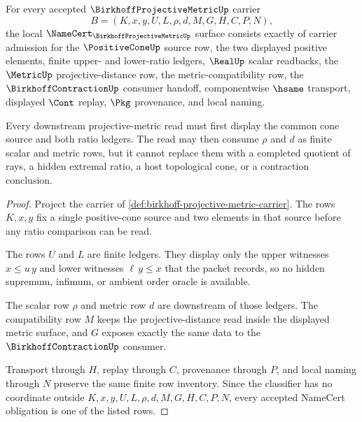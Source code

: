 \begin{theorem}\label{thm:birkhoff-projective-metric-namecert-obligations}
For every accepted $\BirkhoffProjectiveMetricUp$ carrier
$$
B=(K,x,y,U,L,\rho,d,M,G,H,C,P,N),
$$
the local $\NameCert_{\BirkhoffProjectiveMetricUp}$ surface consists exactly of carrier admission for the $\PositiveConeUp$ source row, the two displayed positive elements, finite upper- and lower-ratio ledgers, $\RealUp$ scalar readbacks, the $\MetricUp$ projective-distance row, the metric-compatibility row, the $\BirkhoffContractionUp$ consumer handoff, componentwise $\hsame$ transport, displayed $\Cont$ replay, $\Pkg$ provenance, and local naming.

Every downstream projective-metric read must first display the common cone source and both ratio ledgers. The read may then consume $\rho$ and $d$ as finite scalar and metric rows, but it cannot replace them with a completed quotient of rays, a hidden extremal ratio, a host topological cone, or a contraction conclusion.
\end{theorem}
\begin{proof}
Project the carrier of \autoref{def:birkhoff-projective-metric-carrier}. The rows $K,x,y$ fix a single positive-cone source and two elements in that source before any ratio comparison can be read.

The rows $U$ and $L$ are finite ledgers. They display only the upper witnesses $x\leq u\,y$ and lower witnesses $\ell\,y\leq x$ that the packet records, so no hidden supremum, infimum, or ambient order oracle is available.

The scalar row $\rho$ and metric row $d$ are downstream of those ledgers. The compatibility row $M$ keeps the projective-distance read inside the displayed metric surface, and $G$ exposes exactly the same data to the $\BirkhoffContractionUp$ consumer.

Transport through $H$, replay through $C$, provenance through $P$, and local naming through $N$ preserve the same finite row inventory. Since the classifier has no coordinate outside $K,x,y,U,L,\rho,d,M,G,H,C,P,N$, every accepted NameCert obligation is one of the listed rows.
\end{proof}

